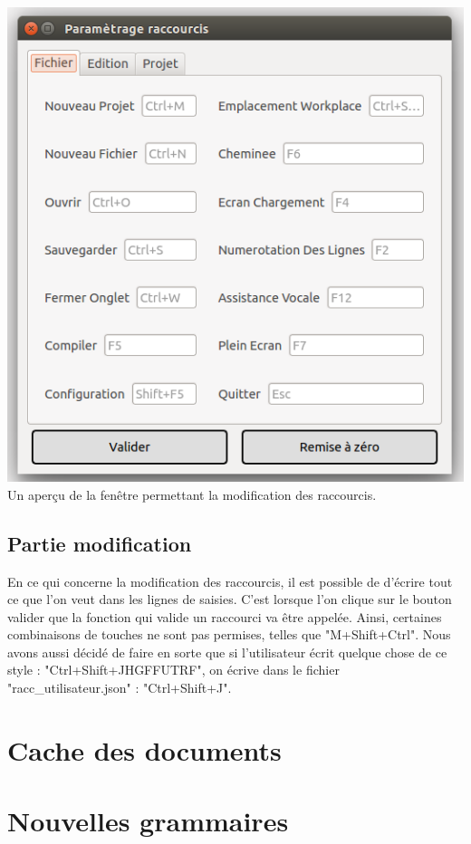 \documentclass[a4paper,12pt]{article}
\begin{document}
\begin{center}
	\includegraphics[scale=0.4]{images/imgs_racc/ex_2.png}\\
	Un aperçu de la fenêtre permettant la modification des raccourcis.
\end{center}

	\subsection{Partie modification}

En ce qui concerne la modification des raccourcis, il est possible de d'écrire tout ce que l'on veut dans les lignes de saisies. C'est lorsque l'on clique sur le bouton valider que la fonction qui valide un raccourci va être appelée. Ainsi, certaines combinaisons de touches ne sont pas permises, telles que "M+Shift+Ctrl". Nous avons aussi décidé de faire en sorte que si l'utilisateur écrit quelque chose de ce style : "Ctrl+Shift+JHGFFUTRF", on écrive dans le fichier "racc\_utilisateur.json" : "Ctrl+Shift+J".

\section{Cache des documents}

\section{Nouvelles grammaires}
\end{document}
